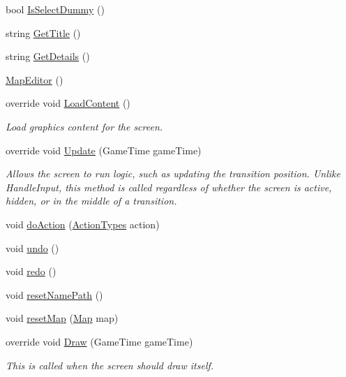 \begin{DoxyCompactItemize}
\item 
bool \hyperlink{classgearit_1_1src_1_1editor_1_1map_1_1_map_editor_ad730df21e0400bc62ea24b6958afb5b3}{Is\+Select\+Dummy} ()
\item 
string \hyperlink{classgearit_1_1src_1_1editor_1_1map_1_1_map_editor_a4d8ba51b7115bc297bf1c81f569612de}{Get\+Title} ()
\item 
string \hyperlink{classgearit_1_1src_1_1editor_1_1map_1_1_map_editor_a89b851294b835383b72f871638ec950f}{Get\+Details} ()
\item 
\hyperlink{classgearit_1_1src_1_1editor_1_1map_1_1_map_editor_adc49ab5928309959da461503883150ab}{Map\+Editor} ()
\item 
override void \hyperlink{classgearit_1_1src_1_1editor_1_1map_1_1_map_editor_a93ad16e2d78f73d7ad7d783f23481430}{Load\+Content} ()
\begin{DoxyCompactList}\small\item\em Load graphics content for the screen. \end{DoxyCompactList}\item 
override void \hyperlink{classgearit_1_1src_1_1editor_1_1map_1_1_map_editor_ab14c09fac3adbf63f3e1c953805bca7c}{Update} (Game\+Time game\+Time)
\begin{DoxyCompactList}\small\item\em Allows the screen to run logic, such as updating the transition position. Unlike Handle\+Input, this method is called regardless of whether the screen is active, hidden, or in the middle of a transition. \end{DoxyCompactList}\item 
void \hyperlink{classgearit_1_1src_1_1editor_1_1map_1_1_map_editor_a43f50684a0d799b791a8b0ce066f35ab}{do\+Action} (\hyperlink{namespacegearit_1_1src_1_1editor_1_1map_1_1action_af036712a7d960b13d1e31954e65c00e3}{Action\+Types} action)
\item 
void \hyperlink{classgearit_1_1src_1_1editor_1_1map_1_1_map_editor_a549faea057ff27783ca9612f01ae5bf0}{undo} ()
\item 
void \hyperlink{classgearit_1_1src_1_1editor_1_1map_1_1_map_editor_a58728c25b70e6e6dedf1df02ec1f7812}{redo} ()
\item 
void \hyperlink{classgearit_1_1src_1_1editor_1_1map_1_1_map_editor_a677d34e36d6a13203101514baeb7fb40}{reset\+Name\+Path} ()
\item 
void \hyperlink{classgearit_1_1src_1_1editor_1_1map_1_1_map_editor_ac59d1e3d1f3711fab5c68362240dce19}{reset\+Map} (\hyperlink{classgearit_1_1src_1_1map_1_1_map}{Map} map)
\item 
override void \hyperlink{classgearit_1_1src_1_1editor_1_1map_1_1_map_editor_ac02670b337e9893d7ee9401f40eca86d}{Draw} (Game\+Time game\+Time)
\begin{DoxyCompactList}\small\item\em This is called when the screen should draw itself. \end{DoxyCompactList}\end{DoxyCompactItemize}
